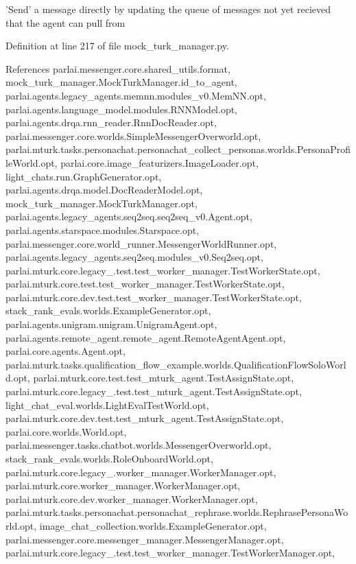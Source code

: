 \begin{DoxyVerb}'Send' a message directly by updating the queue of messages not
yet recieved that the agent can pull from
\end{DoxyVerb}
 

Definition at line 217 of file mock\+\_\+turk\+\_\+manager.\+py.



References parlai.\+messenger.\+core.\+shared\+\_\+utils.\+format, mock\+\_\+turk\+\_\+manager.\+Mock\+Turk\+Manager.\+id\+\_\+to\+\_\+agent, parlai.\+agents.\+legacy\+\_\+agents.\+memnn.\+modules\+\_\+v0.\+Mem\+N\+N.\+opt, parlai.\+agents.\+language\+\_\+model.\+modules.\+R\+N\+N\+Model.\+opt, parlai.\+agents.\+drqa.\+rnn\+\_\+reader.\+Rnn\+Doc\+Reader.\+opt, parlai.\+messenger.\+core.\+worlds.\+Simple\+Messenger\+Overworld.\+opt, parlai.\+mturk.\+tasks.\+personachat.\+personachat\+\_\+collect\+\_\+personas.\+worlds.\+Persona\+Profile\+World.\+opt, parlai.\+core.\+image\+\_\+featurizers.\+Image\+Loader.\+opt, light\+\_\+chats.\+run.\+Graph\+Generator.\+opt, parlai.\+agents.\+drqa.\+model.\+Doc\+Reader\+Model.\+opt, mock\+\_\+turk\+\_\+manager.\+Mock\+Turk\+Manager.\+opt, parlai.\+agents.\+legacy\+\_\+agents.\+seq2seq.\+seq2seq\+\_\+v0.\+Agent.\+opt, parlai.\+agents.\+starspace.\+modules.\+Starspace.\+opt, parlai.\+messenger.\+core.\+world\+\_\+runner.\+Messenger\+World\+Runner.\+opt, parlai.\+agents.\+legacy\+\_\+agents.\+seq2seq.\+modules\+\_\+v0.\+Seq2seq.\+opt, parlai.\+mturk.\+core.\+legacy\+\_.\+test.\+test\+\_\+worker\+\_\+manager.\+Test\+Worker\+State.\+opt, parlai.\+mturk.\+core.\+test.\+test\+\_\+worker\+\_\+manager.\+Test\+Worker\+State.\+opt, parlai.\+mturk.\+core.\+dev.\+test.\+test\+\_\+worker\+\_\+manager.\+Test\+Worker\+State.\+opt, stack\+\_\+rank\+\_\+evals.\+worlds.\+Example\+Generator.\+opt, parlai.\+agents.\+unigram.\+unigram.\+Unigram\+Agent.\+opt, parlai.\+agents.\+remote\+\_\+agent.\+remote\+\_\+agent.\+Remote\+Agent\+Agent.\+opt, parlai.\+core.\+agents.\+Agent.\+opt, parlai.\+mturk.\+tasks.\+qualification\+\_\+flow\+\_\+example.\+worlds.\+Qualification\+Flow\+Solo\+World.\+opt, parlai.\+mturk.\+core.\+test.\+test\+\_\+mturk\+\_\+agent.\+Test\+Assign\+State.\+opt, parlai.\+mturk.\+core.\+legacy\+\_.\+test.\+test\+\_\+mturk\+\_\+agent.\+Test\+Assign\+State.\+opt, light\+\_\+chat\+\_\+eval.\+worlds.\+Light\+Eval\+Test\+World.\+opt, parlai.\+mturk.\+core.\+dev.\+test.\+test\+\_\+mturk\+\_\+agent.\+Test\+Assign\+State.\+opt, parlai.\+core.\+worlds.\+World.\+opt, parlai.\+messenger.\+tasks.\+chatbot.\+worlds.\+Messenger\+Overworld.\+opt, stack\+\_\+rank\+\_\+evals.\+worlds.\+Role\+Onboard\+World.\+opt, parlai.\+mturk.\+core.\+legacy\+\_.\+worker\+\_\+manager.\+Worker\+Manager.\+opt, parlai.\+mturk.\+core.\+worker\+\_\+manager.\+Worker\+Manager.\+opt, parlai.\+mturk.\+core.\+dev.\+worker\+\_\+manager.\+Worker\+Manager.\+opt, parlai.\+mturk.\+tasks.\+personachat.\+personachat\+\_\+rephrase.\+worlds.\+Rephrase\+Persona\+World.\+opt, image\+\_\+chat\+\_\+collection.\+worlds.\+Example\+Generator.\+opt, parlai.\+messenger.\+core.\+messenger\+\_\+manager.\+Messenger\+Manager.\+opt, parlai.\+mturk.\+core.\+legacy\+\_.\+test.\+test\+\_\+worker\+\_\+manager.\+Test\+Worker\+Manager.\+opt, 